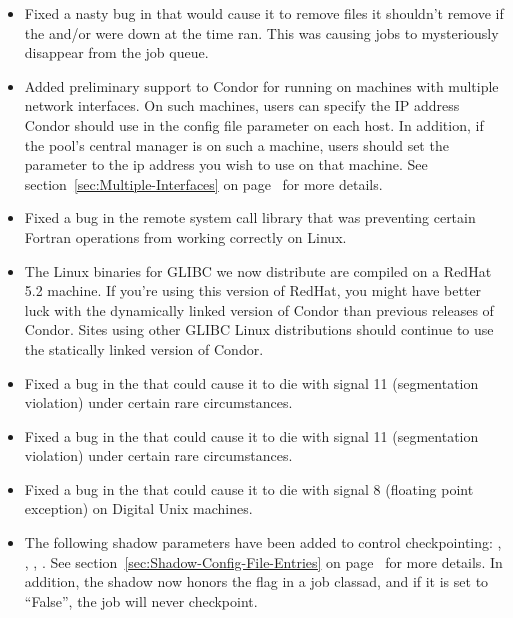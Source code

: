 \begin{itemize}

\item Fixed a nasty bug in  that would cause it to
remove files it shouldn't remove if the  and/or
 were down at the time  ran.
This was causing jobs to mysteriously disappear from the job queue.

\item Added preliminary support to Condor for running on machines with
multiple network interfaces.
On such machines, users can specify the IP address Condor should use
in the  config file parameter on each host. 
In addition, if the pool's central manager is on such a machine, users
should set the  parameter to the ip address you wish
to use on that machine.
See section~\ref{sec:Multiple-Interfaces} on
page~\pageref{sec:Multiple-Interfaces} for more details.

\item Fixed a bug in the remote system call library that was
preventing certain Fortran operations from working correctly on
Linux.  

\item The Linux binaries for GLIBC we now distribute are compiled on a
RedHat 5.2 machine.
If you're using this version of RedHat, you might have better luck
with the dynamically linked version of Condor than previous releases
of Condor.
Sites using other GLIBC Linux distributions should continue to use the
statically linked version of Condor.

\item Fixed a bug in the  that could cause it to die
with signal 11 (segmentation violation) under certain rare
circumstances. 

\item Fixed a bug in the  that could cause it to die
with signal 11 (segmentation violation) under certain rare
circumstances. 

\item Fixed a bug in the  that could cause it to
die with signal 8 (floating point exception) on Digital Unix
machines. 

\item The following shadow parameters have been added to control
checkpointing: ,
, ,
.  See
section~\ref{sec:Shadow-Config-File-Entries} on
page~\pageref{sec:Shadow-Config-File-Entries} for more details.
In addition, the shadow now honors the  flag in a job
classad, and if it is set to ``False'', the job will never
checkpoint.


\end{itemize}
